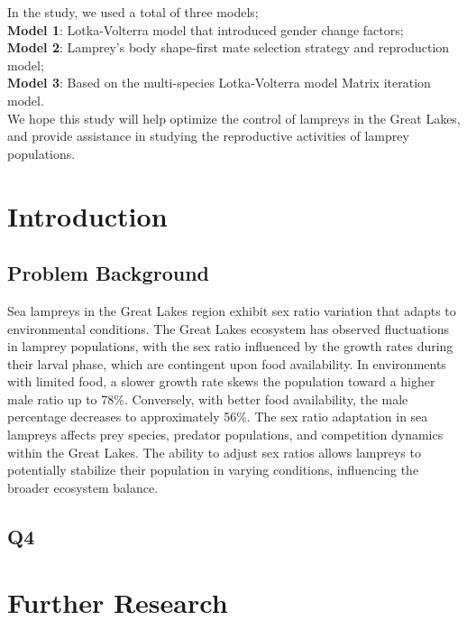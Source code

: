 \documentclass[12pt]{article}
\begin{document}
In the study, we used a total of three models; \\
\textbf{Model 1}: Lotka-Volterra model that introduced gender change factors;\\
\textbf{Model 2}: Lamprey's body shape-first mate selection strategy and reproduction model;\\
\textbf{Model 3}: Based on the multi-species Lotka-Volterra model Matrix iteration model. \\We hope this study will help optimize the control of lampreys in the Great Lakes, and provide assistance in studying the reproductive activities of lamprey populations. 
\newpage
\tableofcontents
\newpage
\clearpage
\pagestyle{fancy}
\newpage
\setcounter{page}{1}


\section{Introduction}
\subsection{Problem Background}
Sea lampreys in the Great Lakes region exhibit sex ratio variation that adapts to environmental conditions. 
The Great Lakes ecosystem has observed fluctuations in lamprey populations, with the sex ratio influenced by 
the growth rates during their larval phase, which are contingent upon food availability. In environments with 
limited food, a slower growth rate skews the population toward a higher male ratio up to 78\%. Conversely, with 
better food availability, the male percentage decreases to approximately 56\%. The sex ratio adaptation in sea 
lampreys affects prey species, predator populations, and competition dynamics within the Great Lakes. The ability 
to adjust sex ratios allows lampreys to potentially stabilize their population in varying conditions, influencing 
the broader ecosystem balance.
\subsection{Q4}
\section{Further Research}
\end{document}
